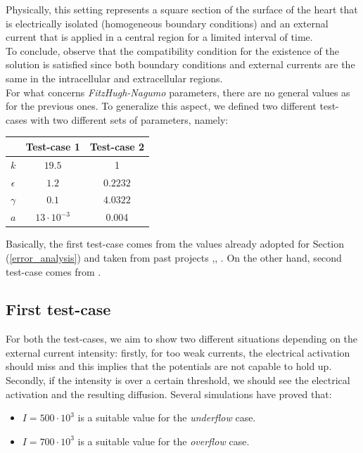 \documentclass[a4paper,11pt]{article}
\begin{document}
\noindent Physically, this setting represents a square section of the surface of the heart that is electrically isolated (homogeneous boundary conditions) and an external current that is applied in a central region for a limited interval of time. \\
To conclude, observe that the compatibility condition for the existence of the solution is satisfied since both boundary conditions and external currents are the same in the intracellular and extracellular regions. \\

\noindent For what concerns \emph{FitzHugh-Nagumo} parameters, there are no general values as for the previous ones. To generalize this aspect, we defined two different test-cases with two different sets of parameters, namely:

\begin{center}
	\begin{tabular}{|c|c|c|} 
		\hline 
		 & Test-case 1 & Test-case 2 \\
		\hline \hline
		$k$ & $19.5 $ & 1 \\
		\hline
		$\epsilon$ & $1.2$ & $0.2232$ \\ 
		\hline
		$\gamma$ & $0.1$ & $4.0322$ \\
		\hline
		$a$ & $13\cdot 10^{-3}$ & 0.004 \\
		\hline
	\end{tabular}
\end{center}

\vspace{4mm}
\noindent Basically, the first test-case comes from the values already adopted for Section (\ref{error_analysis}) and taken from past projects \cite{bagnara},\cite{andreotti}, \cite{marta}. On the other hand, second test-case comes from \cite{mauricio}.

\subsection{First test-case}
For both the test-cases, we aim to show two different situations depending on the external current intensity: firstly, for too weak currents, the electrical activation should miss and this implies that the potentials are not capable to hold up. Secondly, if the intensity is over a certain threshold, we should see the electrical activation and the resulting diffusion. Several simulations have proved that:
\begin{itemize}
	\item $I = 500 \cdot 10^3 $ is a suitable value for the \emph{underflow} case.
	\item $I = 700 \cdot 10^3 $ is a suitable value for the \emph{overflow} case.
\end{itemize}
\end{document}

